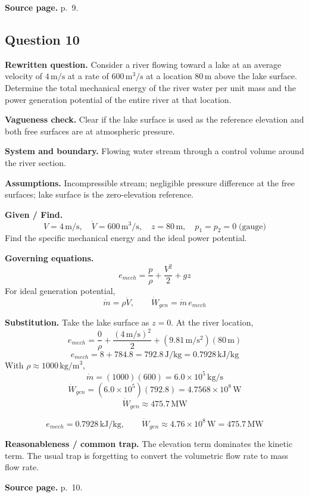 \textbf{Source page.} p.~9.

\subsection*{Question 10}

\textbf{Rewritten question.} Consider a river flowing toward a lake at an average velocity of $4\,\mathrm{m/s}$ at a rate of $600\,\mathrm{m^3/s}$ at a location $80\,\mathrm{m}$ above the lake surface. Determine the total mechanical energy of the river water per unit mass and the power generation potential of the entire river at that location.

\textbf{Vagueness check.} Clear if the lake surface is used as the reference elevation and both free surfaces are at atmospheric pressure.

\textbf{System and boundary.} Flowing water stream through a control volume around the river section.

\textbf{Assumptions.} Incompressible stream; negligible pressure difference at the free surfaces; lake surface is the zero-elevation reference.

\textbf{Given / Find.}
\[
V=4\,\mathrm{m/s},\quad \dot V=600\,\mathrm{m^3/s},\quad z=80\,\mathrm{m},\quad p_1=p_2=0\;\text{(gauge)}
\]
Find the specific mechanical energy and the ideal power potential.

\textbf{Governing equations.}
\[
e_{mech}=\frac{p}{\rho}+\frac{V^2}{2}+gz
\]
For ideal generation potential,
\[
\dot m=\rho\dot V,\qquad \dot W_{gen}=\dot m\,e_{mech}
\]

\textbf{Substitution.}
Take the lake surface as $z=0$. At the river location,
\[
e_{mech}=\frac{0}{\rho}+\frac{(4\,\mathrm{m/s})^2}{2}+(9.81\,\mathrm{m/s^2})(80\,\mathrm{m})
\]
\[
e_{mech}=8+784.8=792.8\,\mathrm{J/kg}=0.7928\,\mathrm{kJ/kg}
\]
With $\rho\approx1000\,\mathrm{kg/m^3}$,
\[
\dot m=(1000)(600)=6.0\times10^5\,\mathrm{kg/s}
\]
\[
\dot W_{gen}=(6.0\times10^5)(792.8)=4.7568\times10^8\,\mathrm{W}
\]
\[
\dot W_{gen}\approx475.7\,\mathrm{MW}
\]

\[
\boxed{e_{mech}=0.7928\,\mathrm{kJ/kg}},\qquad \boxed{\dot W_{gen}\approx4.76\times10^8\,\mathrm{W}=475.7\,\mathrm{MW}}
\]

\textbf{Reasonableness / common trap.} The elevation term dominates the kinetic term. The usual trap is forgetting to convert the volumetric flow rate to mass flow rate.

\textbf{Source page.} p.~10.
